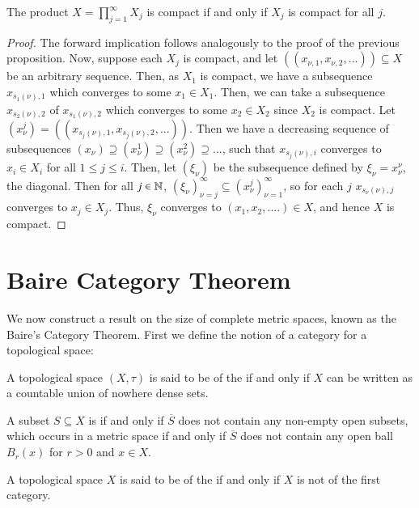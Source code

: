\begin{prop}
    The product $X = \prod_{j=1}^{\infty}X_j$ is compact if and only if $X_j$ is compact for all $j$.
\end{prop}
\begin{proof}
    The forward implication follows analogously to the proof of the previous proposition. Now, suppose each $X_j$ is compact, and let $((x_{\nu,1},x_{\nu,2},...)) \subseteq X$ be an arbitrary sequence. Then, as $X_1$ is compact, we have a subsequence $x_{s_1(\nu),1}$ which converges to some $x_1 \in X_1$. Then, we can take a subsequence $x_{s_2(\nu),2}$ of $x_{s_1(\nu),2}$ which converges to some $x_2 \in X_2$ since $X_2$ is compact. Let $(x^j_{\nu}) = ((x_{s_j(\nu),1},x_{s_j(\nu),2},...))$. Then we have a decreasing sequence of subsequences $(x_{\nu}) \supseteq (x^1_{\nu}) \supseteq (x^2_{\nu}) \supseteq ...$, such that $x_{s_j(\nu),i}$ converges to $x_i \in X_i$ for all $1 \leq j \leq i$. Then, let $(\xi_{\nu})$ be the subsequence defined by $\xi_{\nu} = x^{\nu}_{\nu}$, the diagonal. Then for all $j \in \mathbb N$, $(\xi_{\nu})_{\nu=j}^{\infty} \subseteq (x^j_{\nu})_{\nu=1}^{\infty}$, so for each $j$ $x_{s_{\nu}(\nu),j}$ converges to $x_j \in X_j$. Thus, $\xi_{\nu}$ converges to $(x_1,x_2,....) \in X$, and hence $X$ is compact.
\end{proof}


\section{Baire Category Theorem}

We now construct a result on the size of complete metric spaces, known as the Baire's Category Theorem. First we define the notion of a category for a topological space:

\begin{defn}
    A topological space $(X,\tau)$ is said to be of the  if and only if $X$ can be written as a countable union of nowhere dense sets.
\end{defn}

\begin{defn}
    A subset $S \subseteq X$ is  if and only if $\overline{S}$ does not contain any non-empty open subsets, which occurs in a metric space if and only if $\overline{S}$ does not contain any open ball $B_r(x)$ for $r > 0$ and $x \in X$.
\end{defn}

\begin{defn}
    A topological space $X$ is said to be of the  if and only if $X$ is not of the first category.
\end{defn}


